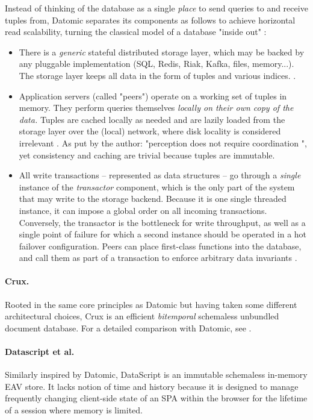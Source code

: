 Instead of thinking of the database as a single \emph{place} to send queries to and receive tuples from, Datomic separates its components as follows to achieve horizontal read scalability, turning the classical model of a database "inside out" \cite{kleppmann2017designing}:
\begin{itemize}
  \item There is a \emph{generic} stateful distributed storage layer, which may be backed by any pluggable implementation (SQL, Redis, Riak, Kafka, files, memory...). The storage layer keeps all data in the form of tuples and various indices. \cite{hickey2019datomic}.
  \item Application servers (called "peers") operate on a working set of tuples in memory. They perform queries themselves \emph{locally on their own copy of the data.} Tuples are cached locally as needed and are lazily loaded from the storage layer over the (local) network, where disk locality is considered irrelevant \cite{ananthanarayanan2011disk}. As put by the author: "perception does not require coordination \cite{hickey2012values}", yet consistency and caching are trivial because tuples are immutable.
  \item All write transactions -- represented as data structures -- go through a \emph{single} instance of the \emph{transactor} component, which is the only part of the system that may write to the storage backend. Because it is one single threaded instance, it can impose a global order on all incoming transactions. Conversely, the transactor is the bottleneck for write throughput, as well as a single point of failure for which a second instance should be operated in a hot failover configuration. Peers can place first-class functions into the database, and call them as part of a transaction to enforce arbitrary data invariants \cite{datomicdocs}.
\end{itemize}


\paragraph{Crux.} Rooted in the same core principles as Datomic but having taken some different architectural choices, Crux is an efficient \emph{bitemporal} schemaless unbundled document database. For a detailed comparison with Datomic, see \cite{juxtcrux}.

\cleardoublepage

\paragraph{Datascript et al.} Similarly inspired by Datomic, DataScript \cite{prokopov15datascript} is an immutable schemaless in-memory EAV store. It lacks notion of time and history because it is designed to manage frequently changing client-side state of an \gls{SPA} within the browser for the lifetime of a session where memory is limited.

